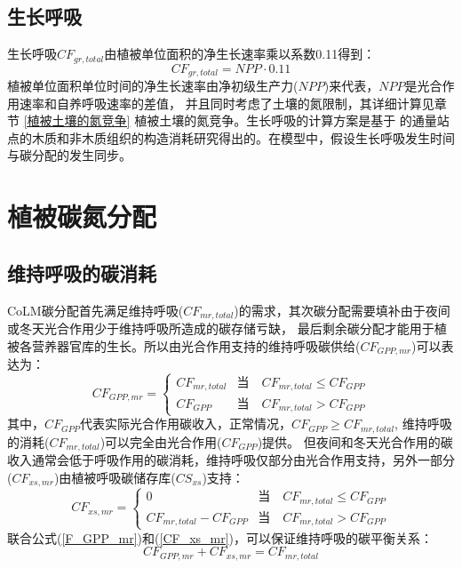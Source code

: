 \subsection{生长呼吸}\label{生长呼吸}
生长呼吸$CF_{gr,total}$由植被单位面积的净生长速率乘以系数0.11得到：
\begin{equation}
CF_{gr,total}=NPP \cdot 0.11
\end{equation}
植被单位面积单位时间的净生长速率由净初级生产力($NPP$)来代表，$NPP$是光合作用速率和自养呼吸速率的差值，
并且同时考虑了土壤的氮限制，其详细计算见章节 \ref{植被土壤的氮竞争} 植被土壤的氮竞争。生长呼吸的计算方案是基于\citet{atkins2018quantifying}
的通量站点的木质和非木质组织的构造消耗研究得出的。在模型中，假设生长呼吸发生时间与碳分配的发生同步。
\section{植被碳氮分配}\label{植被碳氮分配}
\subsection{维持呼吸的碳消耗}
CoLM碳分配首先满足维持呼吸($CF_{mr,total}$)的需求，其次碳分配需要填补由于夜间或冬天光合作用少于维持呼吸所造成的碳存储亏缺，
最后剩余碳分配才能用于植被各营养器官库的生长。所以由光合作用支持的维持呼吸碳供给($CF_{GPP,mr}$)可以表达为：
\begin{equation}\label{F_GPP_mr}
CF_{GPP,mr}=\left\{\begin{array}{cl}CF_{mr, total} & \text{当}\quad CF_{mr, total} \leq CF_{GPP} \\ CF_{GPP} & \text{当}\quad CF_{mr,total}>CF_{GPP} \end{array}\right.
\end{equation}
其中，$CF_{GPP}$代表实际光合作用碳收入，正常情况，$CF_{GPP}\geq CF_{mr,total}$,
维持呼吸的消耗($CF_{mr,total}$)可以完全由光合作用($CF_{GPP}$)提供。
但夜间和冬天光合作用的碳收入通常会低于呼吸作用的碳消耗，维持呼吸仅部分由光合作用支持，另外一部分($CF_{xs,mr}$)由植被呼吸碳储存库($CS_{xs}$)支持：
\begin{equation}\label{CF_xs_mr}
CF_{xs, mr}=\left\{\begin{array}{cl}0 & \text{当}\quad CF_{mr, total} \leq CF_{GPP} \\ CF_{mr, total}-CF_{GPP} & \text{当}\quad CF_{mr, total}>CF_{GPP}\end{array}\right.
\end{equation}
联合公式(\ref{F_GPP_mr})和(\ref{CF_xs_mr})，可以保证维持呼吸的碳平衡关系：
\begin{equation}
CF_{GPP, mr}+CF_{xs, mr}=CF_{mr, total}
\end{equation}


